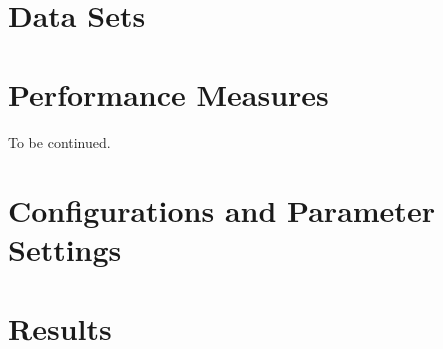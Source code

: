 
\section{Data Sets}\label{sec:experiments:data_sets}

\section{Performance Measures}\label{sec:experiments:performance_measures}

To be continued\footnotemark. 


\section{Configurations and Parameter Settings}
\label{sec:experiments:configurations}

\section{Results}\label{sec:experiments:results}
